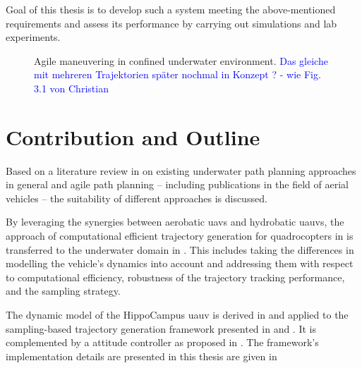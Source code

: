 Goal of this thesis is to develop such a system meeting the above-mentioned requirements and assess its performance by carrying out simulations and lab experiments.

\begin{figure}
    \centering
    
    \caption{Agile maneuvering in confined underwater environment. \textcolor{blue}{Das gleiche mit mehreren Trajektorien später nochmal in Konzept ? - wie Fig. 3.1 von Christian}}
    \label{fig:my_label}
\end{figure}


\section{Contribution and Outline}

Based on a literature review in  on existing underwater path planning approaches in general and agile path planning -- including publications in the field of aerial vehicles -- the suitability of different approaches is discussed. 

By leveraging the synergies between aerobatic \acp{uav} and hydrobatic \acp{uauv}, the approach of computational efficient trajectory generation for quadrocopters in \cite{MuellerHehn15} is transferred to the underwater domain in .
This includes taking the differences in modelling the vehicle's dynamics into account and addressing them with respect to computational efficiency, robustness of the trajectory tracking performance, and the sampling strategy.

The dynamic model of the HippoCampus \ac{uauv} is derived in  and applied to the sampling-based trajectory generation framework presented in  and .
It is complemented by a attitude controller as proposed in .
The framework's implementation details are presented in this thesis are given in 



